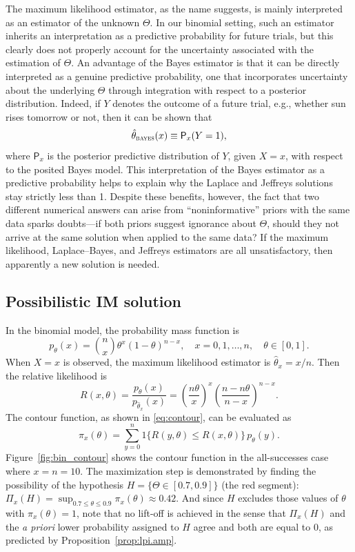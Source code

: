 \documentclass[a4paper, 12pt]{article}
\theoremstyle{plain}
\theoremstyle{definition}
\theoremstyle{remark}
\newcommand{\prob}{\mathsf{P}}
\newcommand{\uPi}{\mathsf{\Pi}}%
\begin{document}
The maximum likelihood estimator, as the name suggests, is mainly interpreted as an estimator of the unknown $\Theta$.  In our binomial setting, such an estimator inherits an interpretation as a predictive probability for future trials, but this clearly does not properly account for the uncertainty associated with the estimation of $\Theta$.  An advantage of the Bayes estimator is that it can be directly interpreted as a genuine predictive probability, one that incorporates uncertainty about the underlying $\Theta$ through integration with respect to a posterior distribution.  Indeed, if $Y$ denotes the outcome of a future trial, e.g., whether sun rises tomorrow or not, then it can be shown that
\[ \hat\theta_\text{\sc bayes}(x) \equiv \prob_x(Y=1), \]
where $\prob_x$ is the posterior predictive distribution of $Y$, given $X=x$, with respect to the posited Bayes model.  This interpretation of the Bayes estimator as a predictive probability helps to explain why the Laplace and Jeffreys solutions stay strictly less than 1.  Despite these benefits, however, the fact that two different numerical answers can arise from ``noninformative'' priors with the same data sparks doubts---if both priors suggest ignorance about $\Theta$, should they not arrive at the same solution when applied to the same data? If the maximum likelihood, Laplace--Bayes, and Jeffreys estimators are all unsatisfactory, then apparently a new solution is needed. 


\subsection{Possibilistic IM solution}

In the binomial model, the probability mass function is 
\[ p_\theta(x) = \binom{n}{x} \theta^x (1-\theta)^{n-x}, \quad x=0,1,\ldots,n, \quad \theta \in [0,1]. \]
When $X=x$ is observed, the maximum likelihood estimator is $\hat\theta_x = x/n$.  Then the relative likelihood is
\[
R(x,\theta) = \frac{p_\theta(x)}{p_{\hat\theta_x}(x)} = \left( \frac{n\theta}{x} \right)^x \left( \frac{n-n\theta}{n-x}\right)^{n-x}.
\]
The contour function, as shown in \eqref{eq:contour}, can be evaluated as
\begin{equation}
\label{eq:bin_contour}
\pi_x(\theta) = \sum_{y=0}^n 1\{ R(y, \theta) \leq R(x, \theta) \} \, p_\theta(y).
\end{equation}
Figure~\ref{fig:bin_contour} shows the contour function in the all-successes case where $x=n=10$. The maximization step is demonstrated by finding the possibility of the hypothesis $H=\{\Theta\in[0.7, 0.9]\}$ (the red segment): $\uPi_x(H) = \sup_{0.7 \le \theta \le 0.9} \pi_x(\theta) \approx 0.42$.  And since $H$ excludes those values of $\theta$ with $\pi_x(\theta)=1$, note that no lift-off is achieved in the sense that $\uPi_x(H)$ and the {\em a priori} lower probability assigned to $H$ agree and both are equal to 0, as predicted by Proposition~\ref{prop:lpi.amp}.  
\end{document}
